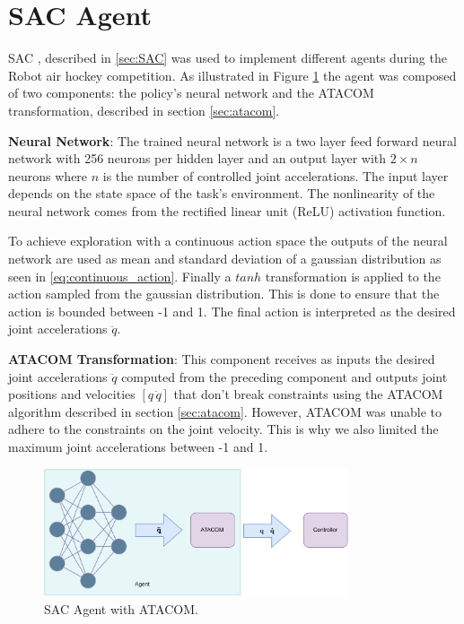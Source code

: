 \section{SAC Agent}
\label{sec:sac_agent}

SAC \cite{SAC}, described in \ref{sec:SAC} was used to implement different agents during the Robot air hockey competition.
As illustrated in Figure \ref{fig:sac_agent} the agent was composed of two components: the policy's neural network and the ATACOM transformation, described in section \ref{sec:atacom}.

\textbf{Neural Network}:
The trained neural network is a two layer feed forward neural network with 256 neurons per hidden layer and an output layer with $2 \times n$ neurons 
where $n$ is the number of controlled joint accelerations. 
The input layer depends on the state space of the task's environment. The nonlinearity of the neural network comes from the
rectified linear unit (ReLU) activation function.

To achieve exploration with a continuous action space the outputs of the neural network are used as mean and standard deviation of a gaussian distribution as seen in \eqref{eq:continuous_action}.
Finally a $tanh$ transformation is applied to the action sampled from the gaussian distribution. This is done to ensure that the action is bounded between -1 and 1.
The final action is interpreted as the desired joint accelerations $\ddot{q}$.

\textbf{ATACOM Transformation}:
This component receives as inputs the desired joint accelerations $\ddot{q}$ computed from the preceding component and outputs joint positions and velocities $[q\,\dot{q}]$ 
that don't break constraints using the ATACOM algorithm \cite{Atacom} described in section \ref{sec:atacom}. However, ATACOM was unable to adhere to the constraints on the joint velocity.
This is why we also limited the maximum joint accelerations between -1 and 1.

\begin{figure}[H]
    \centering
    \includegraphics[width=0.8\textwidth]{Images/nn_atacom.pdf}
    \caption{SAC Agent with ATACOM.}
    \label{fig:sac_agent}
\end{figure}


